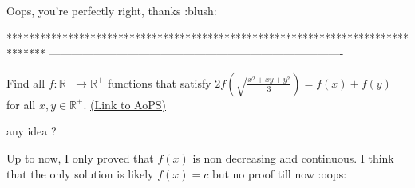 \begin{solution}
	Oops, you're perfectly right, thanks :blush:
\end{solution}
*******************************************************************************
-------------------------------------------------------------------------------

\begin{problem}
	Find all $f:\mathbb{R}^+ \rightarrow \mathbb{R}^+$  functions that satisfy $2f\left (\sqrt{\frac{x^2+xy+y^2}{3}}\right )=f(x)+f(y)$ for all $x,y\in \mathbb{R}^+$.
	\flushright \href{https://artofproblemsolving.com/community/c6h484381}{(Link to AoPS)}
\end{problem}



\begin{solution}
	any idea ?
\end{solution}



\begin{solution}
	Up to now, I only proved that $f(x)$ is non decreasing and continuous.
I think that the only solution is likely $f(x)=c$ but no proof till now :oops:
\end{solution}



